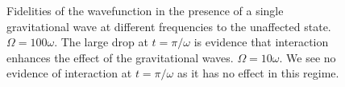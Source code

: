 \begin{figure}[htbp]
  \begin{center}
    \qquad
    \caption{\label{fig:Fidelity} Fidelities of the wavefunction in
      the presence of a single gravitational wave at different
      frequencies to the unaffected state. 
      $\Omega = 100\omega$. The large drop at $t=\pi/\omega$ is
      evidence that interaction enhances the effect of the
      gravitational waves.  $\Omega =
      10\omega$. We see no evidence of interaction at $t=\pi/\omega$
      as it has no effect in this regime. }
  \end{center}
\end{figure}

